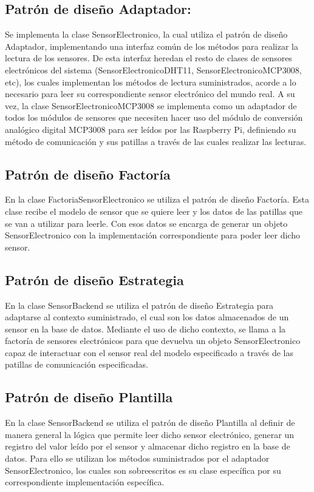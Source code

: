     \subsection{Patrón de diseño Adaptador:}
        Se implementa la clase SensorElectronico, la cual utiliza el patrón de diseño Adaptador, implementando una interfaz común de los métodos para realizar la lectura de los sensores. De esta interfaz heredan el resto de clases de sensores electrónicos del sistema (SensorElectronicoDHT11, SensorElectronicoMCP3008, etc), los cuales implementan los métodos de lectura suministrados, acorde a lo necesario para leer su correspondiente sensor electrónico del mundo real.
        A su vez, la clase SensorElectronicoMCP3008 se implementa como un adaptador de todos los módulos de sensores que necesiten hacer uso del módulo de conversión analógico digital MCP3008 para ser leídos por las Raspberry Pi, definiendo su método de comunicación y sus patillas a través de las cuales realizar las lecturas. 
    \subsection{Patrón de diseño Factoría}
        En la clase FactoriaSensorElectronico se utiliza el patrón de diseño Factoría. Esta clase recibe el modelo de sensor que se quiere leer y los datos de las patillas que se van a utilizar para leerle. Con esos datos se encarga de generar un objeto SensorElectronico con la implementación correspondiente para poder leer dicho sensor.
    \subsection{Patrón de diseño Estrategia}
        En la clase SensorBackend se utiliza el patrón de diseño Estrategia para adaptarse al contexto suministrado, el cual son los datos almacenados de un sensor en la base de datos. Mediante el uso de dicho contexto, se llama a la factoría de sensores electrónicos para que devuelva un objeto SensorElectronico capaz de interactuar con el sensor real del modelo especificado a través de las patillas de comunicación especificadas. 
    \subsection{Patrón de diseño Plantilla}
        En la clase SensorBackend se utiliza el patrón de diseño Plantilla al definir de manera general la lógica que permite leer dicho sensor electrónico, generar un registro del valor leído por el sensor y almacenar dicho registro en la base de datos. Para ello se utilizan los métodos suministrados por el adaptador SensorElectronico, los cuales son sobreescritos es su clase específica por su correspondiente implementación específica.
